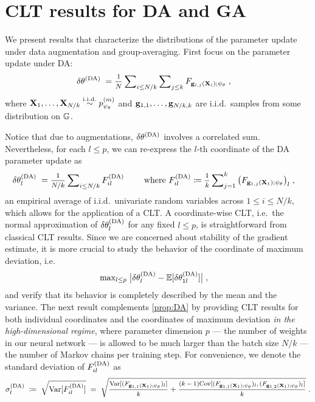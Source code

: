 \section{CLT results for DA and GA} \label{appendix:CLT}

\noindent
We present results that characterize the distributions of the parameter update under data augmentation and group-averaging. First focus on the parameter update under DA:
\begin{align*}
    \delta \theta^{(\rm DA)}
    \;=&\; 
    \mfrac{1}{N} \msum_{i \leq N/k} \msum_{j \leq k}
    F_{\bg_{i,j}(\bX_i); \psi_\theta}
    \;,
\end{align*}
where $\mathbf{X}_1, \ldots, \mathbf{X}_{N/k}  \overset{\rm i.i.d.}{\sim} p^{(m)}_{\psi_\theta}$ and $\mathbf{g}_{1,1}, \ldots, \mathbf{g}_{N/k,k}$ are i.i.d.~samples from some distribution on $\mathbb{G}$. 

\vspace{.2em}

Notice that due to augmentations, $\delta \theta^{(\rm DA)}$ involves a correlated sum. Nevertheless, for each $l \leq p$, we can re-express the $l$-th coordinate of the DA parameter update as
\begin{align*}
    \delta \theta^{(\rm DA)}_l \;=&\; \mfrac{1}{N / k} \msum_{i \leq N / k} F^{(\rm DA)}_{il}
    \qquad 
    \text{ where } 
    F^{(\rm DA)}_{il} \coloneqq \mfrac{1}{k} \msum_{j=1}^k \big( F_{\bg_{1,j}(\bX_1); \psi_\theta} \big)_l
    \;,
\end{align*}
an empirical average of  i.i.d.~univariate random variables across $1 \leq i \leq N/k$, which allows for the application of a CLT. A coordinate-wise CLT, i.e.~the normal approximation of $\delta \theta^{(\rm DA)}_l$ for any fixed $l \leq p$, is straightforward from classical CLT results. Since we are concerned about stability of the gradient estimate, it is more crucial to study the behavior of the coordinate of maximum deviation, i.e.
\begin{align*}
    \max\nolimits_{l \leq p} & \; \big| \delta \theta^{(\rm DA)}_l - \mathbb{E}[ \delta \theta^{(\rm DA)}_{1l}] \big|\;,
\end{align*}
and verify that its behavior is completely described by the mean and the variance. The next result complements \cref{prop:DA} by providing CLT results for both individual coordinates and the coordinates of maximum deviation \emph{in the high-dimensional regime}, where parameter dimension $p$ --- the number of weights in our neural network --- is allowed to be much larger than the batch size $N/k$ --- the number of Markov chains per training step. For convenience, we denote the standard deviation of $F^{(\rm DA)}_{il}$ as
\begin{align*}
    \sigma^{(\rm DA)}_l 
    \;\coloneqq\; 
    \sqrt{\Var[F^{(\rm DA)}_{il}]}
    \;=\;
    \sqrt{
         \mfrac{\Var[  ( F_{\bg_{1,1}(\bX_1); \psi_\theta} )_l ]}{k}    
         +
         \mfrac{(k-1)\Cov[  ( F_{\bg_{1,1}(\bX_1); \psi_\theta} )_l ,  ( F_{\bg_{1,2}(\bX_1); \psi_\theta} )_l  ]  }{k} 
    }
    \;.
\end{align*}

